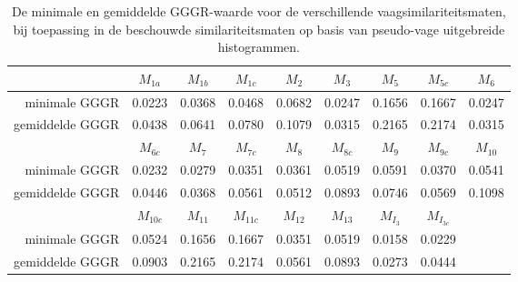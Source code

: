 \begin{table}[bp]
\vspace{10pt}
\centering
\small
\begin{tabular}{r|cccccccc}
& $M_{1a}$ & $M_{1b}$ & $M_{1c}$ & $M_{2}$ & $M_{3}$ & $M_{5}$ & $M_{5c}$ & $M_{6}$ \\
\hline
minimale GGGR & 0.0223 & 0.0368 & 0.0468 & 0.0682 & 0.0247 & 0.1656 & 0.1667 & 0.0247 \\
gemiddelde GGGR & 0.0438 & 0.0641 & 0.0780 & 0.1079 & 0.0315 & 0.2165 & 0.2174 & 0.0315\vspace{8pt}\\
& $M_{6c}$ & $M_{7}$ & $M_{7c}$ & $M_{8}$ & $M_{8c}$ & $M_{9}$ & $M_{9c}$ & $M_{10}$ \\
\hline
minimale GGGR & 0.0232 & 0.0279 & 0.0351 & 0.0361 & 0.0519 & 0.0591 & 0.0370 & 0.0541 \\
gemiddelde GGGR & 0.0446 & 0.0368 & 0.0561 & 0.0512 & 0.0893 & 0.0746 & 0.0569 & 0.1098\vspace{8pt}\\
& $M_{10c}$ & $M_{11}$ & $M_{11c}$ & $M_{12}$ & $M_{13}$ & $M_{I_3}$ & $M_{I_{3c}}$ \\
\hline
minimale GGGR & 0.0524 & 0.1656 & 0.1667 & 0.0351 & 0.0519 & 0.0158 & 0.0229 \\
gemiddelde GGGR & 0.0903 & 0.2165 & 0.2174 & 0.0561 & 0.0893 & 0.0273 & 0.0444
\end{tabular}
\vspace{10pt}
\caption{\label{tab:stat_gegevens_pseudo-vaag_uitgebreid_histogram_maten}De minimale en gemiddelde 
GGGR-waarde voor 
de verschillende vaagsimilariteitsmaten, bij toepassing in de beschouwde  
similariteitsmaten op basis van pseudo-vage uitgebreide histogrammen.}
\end{table}

